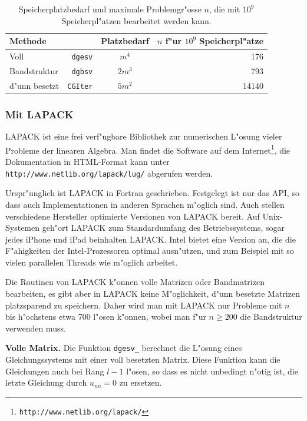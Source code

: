 \begin{table}
\begin{center}
\begin{tabular}{|lr|c|r|}
\hline
Methode&&Platzbedarf&$n$ f"ur $10^9$ Speicherpl"atze\\
\hline
Voll&{\tt dgesv}&$m^4$&176\\
Bandstruktur&{\tt dgbsv}&$2m^3$&793\\
d"unn besetzt&{\tt CGIter}&$5m^2$&14140\\
\hline
\end{tabular}
\end{center}
\caption{Speicherplatzbedarf und maximale Problemgr"osse $n$, die mit $10^9$
Speicherpl"atzen bearbeitet werden kann.\label{bedarf}}
\end{table}

\subsubsection{Mit LAPACK}
LAPACK ist eine frei verf"ugbare Bibliothek zur numerischen L"osung 
vieler Probleme der linearen Algebra. 
Man findet die Software auf dem Internet\footnote{\small\tt http://www.netlib.org/lapack/}, die Dokumentation in HTML-Format
kann unter
{\small\tt http://www.netlib.org/lapack/lug/} abgerufen werden.

Urspr"unglich ist LAPACK in Fortran geschrieben.
Festgelegt ist nur das API,
so dass auch Implementationen in anderen Sprachen m"oglich sind.
Auch stellen verschiedene
Hersteller optimierte Versionen von LAPACK bereit.
Auf Unix-Systemen geh"ort LAPACK zum Standardumfang
des Betriebssystems, sogar jedes iPhone und iPad beinhalten LAPACK.
Intel bietet eine Version an, die die F"ahigkeiten der Intel-Prozessoren
optimal ausn"utzen, und zum Beispiel mit so vielen parallelen Threads
wie m"oglich arbeitet.

Die Routinen von LAPACK k"onnen volle Matrizen oder Bandmatrizen
bearbeiten, es gibt aber in LAPACK keine M"oglichkeit, d"unn besetzte
Matrizen platzsparend zu speichern. Daher wird man mit LAPACK nur Probleme
mit $n$ bis h"ochstens etwa 700 l"osen k"onnen, wobei man f"ur $n\ge 200$
die Bandstruktur verwenden muss.

\medskip
{\parindent0pt
{\bf Volle Matrix.}}
Die Funktion {\tt dgesv\_} berechnet die L"osung eines Gleichungssystems mit 
einer voll besetzten Matrix. Diese Funktion kann die Gleichungen auch
bei Rang $l-1$ l"osen, so dass es nicht unbedingt n"otig ist, die letzte
Gleichung durch $u_{nn}=0$ zu ersetzen.

